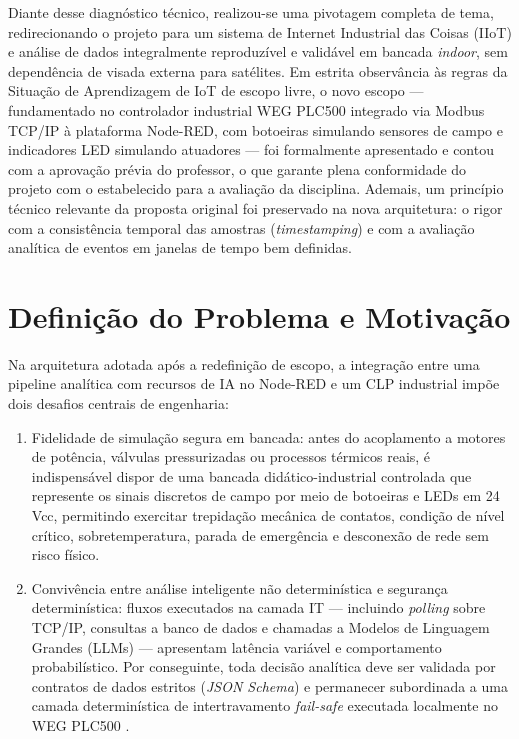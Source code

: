 Diante desse diagnóstico técnico, realizou-se uma pivotagem completa de tema, redirecionando o projeto para um sistema de Internet Industrial das Coisas (IIoT) e análise de dados integralmente reproduzível e validável em bancada \textit{indoor}, sem dependência de visada externa para satélites. Em estrita observância às regras da Situação de Aprendizagem de IoT de escopo livre, o novo escopo --- fundamentado no controlador industrial WEG PLC500 integrado via Modbus TCP/IP à plataforma Node-RED, com botoeiras simulando sensores de campo e indicadores LED simulando atuadores --- foi formalmente apresentado e contou com a aprovação prévia do professor, o que garante plena conformidade do projeto com o estabelecido para a avaliação da disciplina. Ademais, um princípio técnico relevante da proposta original foi preservado na nova arquitetura: o rigor com a consistência temporal das amostras (\textit{timestamping}) e com a avaliação analítica de eventos em janelas de tempo bem definidas.

\section{Definição do Problema e Motivação}
\label{sec:problema}

Na arquitetura adotada após a redefinição de escopo, a integração entre uma pipeline analítica com recursos de IA no Node-RED e um CLP industrial impõe dois desafios centrais de engenharia:

\begin{enumerate}
  \item Fidelidade de simulação segura em bancada: antes do acoplamento a motores de potência, válvulas pressurizadas ou processos térmicos reais, é indispensável dispor de uma bancada didático-industrial controlada que represente os sinais discretos de campo por meio de botoeiras e LEDs em 24\,Vcc, permitindo exercitar trepidação mecânica de contatos, condição de nível crítico, sobretemperatura, parada de emergência e desconexão de rede sem risco físico.
  \item Convivência entre análise inteligente não determinística e segurança determinística: fluxos executados na camada IT --- incluindo \textit{polling} sobre TCP/IP, consultas a banco de dados e chamadas a Modelos de Linguagem Grandes (LLMs) --- apresentam latência variável e comportamento probabilístico. Por conseguinte, toda decisão analítica deve ser validada por contratos de dados estritos (\textit{JSON Schema}) e permanecer subordinada a uma camada determinística de intertravamento \textit{fail-safe} executada localmente no WEG PLC500 \cite{stouffer_nist_ot}.
\end{enumerate}

